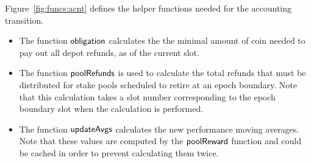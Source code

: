 Figure~\ref{fig:funcs:acnt} defines the helper functions needed for the accounting transition.

\begin{itemize}
  \item The function $\mathsf{obligation}$ calculates the the minimal amount of coin needed to
    pay out all depot refunds, as of the current slot.
  \item The function $\mathsf{poolRefunds}$ is used to calculate the total refunds
    that must be distributed for stake pools scheduled to retire at an epoch boundary.
    Note that this calculation takes a slot number corresponding to the epoch boundary slot
    when the calculation is performed.
  \item The function $\mathsf{updateAvgs}$ calculates the new performance moving averages.
    Note that these values are computed by the $\mathsf{poolReward}$ function and could be cached
    in order to prevent calculating them twice.
\end{itemize}


